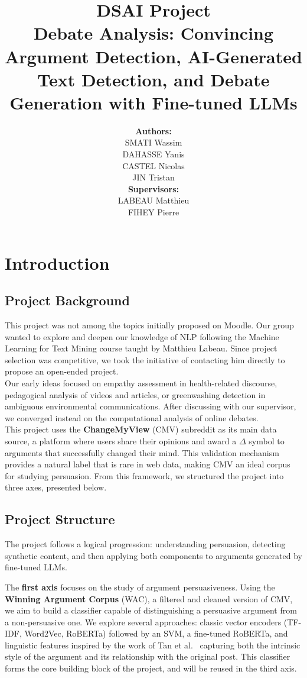 \documentclass[11pt,a4paper]{article}
\title{\Huge \textbf{DSAI Project} \\ \vspace{0.5cm}
\Large Debate Analysis: Convincing Argument Detection, AI-Generated Text Detection, and Debate Generation with Fine-tuned LLMs}
\author{
\begin{tabular}{c}
\textbf{Authors:}\\
SMATI Wassim \\
DAHASSE Yanis \\
CASTEL Nicolas \\
JIN Tristan \\[0.8cm]
\textbf{Supervisors:}\\
LABEAU Matthieu \\
FIHEY Pierre
\end{tabular}
}
\date{}
\begin{document}
\maketitle



\newpage
\tableofcontents
\newpage

\newpage
\section{Introduction}
\subsection{Project Background}
This project was not among the topics initially proposed on Moodle.
Our group wanted to explore and deepen our knowledge of NLP following the
Machine Learning for Text Mining course taught by Matthieu Labeau.
Since project selection was competitive, we took the initiative of contacting
him directly to propose an open-ended project.\\
Our early ideas focused on empathy assessment in health-related discourse,
pedagogical analysis of videos and articles, or greenwashing detection in
ambiguous environmental communications. After discussing with our supervisor,
we converged instead on the computational analysis of online debates.\\
This project uses the \textbf{ChangeMyView} (CMV) subreddit as its main data source,
a platform where users share their opinions and award a $\Delta$ symbol to
arguments that successfully changed their mind. This validation mechanism
provides a natural label that is rare in web data, making CMV an ideal corpus
for studying persuasion. From this framework, we structured the project into
three axes, presented below.

\subsection{Project Structure}
The project follows a logical progression: understanding persuasion,
detecting synthetic content, and then applying both components to arguments
generated by fine-tuned LLMs.

The \textbf{first axis} focuses on the study of argument persuasiveness. Using the
\textbf{Winning Argument Corpus} (WAC), a filtered and cleaned version of CMV,
we aim to build a classifier capable of distinguishing a persuasive argument
from a non-persuasive one. We explore several approaches: classic vector
encoders (TF-IDF, Word2Vec, RoBERTa) followed by an SVM, a fine-tuned
RoBERTa, and linguistic features inspired by the work of Tan et al.~\cite{tan2016winning}
capturing both the intrinsic style of the argument and its relationship with
the original post. This classifier forms the core building block of the project,
and will be reused in the third axis.
\end{document}
